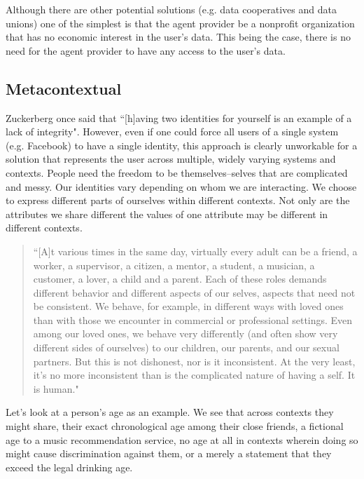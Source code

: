 \documentclass[11pt, oneside]{article}   	%
\begin{document}
Although there are other potential solutions (e.g. data cooperatives and data unions) one of the simplest is that the agent provider be a nonprofit organization that has no economic interest in the user's data. This being the case, there is no need for the agent provider to have any access to the user's data.

\subsection{Metacontextual}

Zuckerberg once said that ``[h]aving two identities for yourself is an example of a lack of integrity"\cite{Kirkpatrick2011}. However, even if one could force all users of a single system (e.g. Facebook) to have a single identity, this approach is clearly unworkable for a solution that represents the user across multiple, widely varying systems and contexts. People need the freedom to be themselves--selves that are complicated and messy. Our identities vary depending on whom we are interacting. We choose to express different parts of ourselves within different contexts. Not only are the attributes we share different the values of one attribute may be different in different contexts. 

\begin{quote} ``[A]t various times in the same day, virtually every adult can be a friend, a worker, a supervisor, a citizen, a mentor, a student, a musician, a customer, a lover, a child and a parent. Each of these roles demands different behavior and different aspects of our selves, aspects that need not be consistent. We behave, for example, in different ways with loved ones than with those we encounter in commercial or professional settings. Even among our loved ones, we behave very differently (and often show very different sides of ourselves) to our children, our parents, and our sexual partners. But this is not dishonest, nor is it inconsistent. At the very least, it's no more inconsistent than is the complicated nature of having a self. It is human."\cite[p122]{Richards2021}
\end{quote}

Let's look at a person's age as an example. We see that across contexts they might share, their exact chronological age among their close friends, a fictional age to a music recommendation service, no age at all in contexts wherein doing so might cause discrimination against them, or a merely a statement that they exceed the legal drinking age. 
\end{document}
